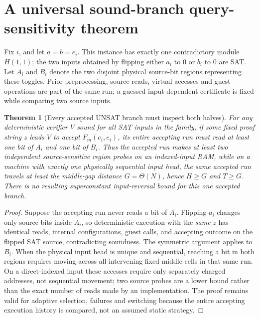 \documentclass[11pt]{article}
\newtheorem{theorem}{Theorem}
\begin{document}
\section{A universal sound-branch query-sensitivity theorem}
Fix $i$, and let $a=b=e_i$. This instance has exactly one contradictory module $H(1,1)$; the two inputs obtained by flipping either $a_i$ to $0$ or $b_i$ to $0$ are SAT. Let $A_i$ and $B_i$ denote the two disjoint physical source-bit regions representing these toggles. Prior preprocessing, source reads, virtual accesses and guest operations are part of the same run; a guessed input-dependent certificate is fixed while comparing two source inputs.
\begin{theorem}[Every accepted UNSAT branch must inspect both halves]\label{th:two}
For \emph{any} deterministic verifier $V$ sound for all SAT inputs in the family, if some fixed proof string $z$ leads $V$ to accept $F_m(e_i,e_i)$, its entire accepting run must read at least one bit of $A_i$ and one bit of $B_i$. Thus the accepted run makes at least two independent source-sensitive region probes on an indexed-input RAM, while on a machine with exactly one physically sequential input head, the same accepted run travels at least the middle-gap distance $G=\Theta(N)$, hence $H\ge G$ and $T\ge G$. There is no resulting superconstant input-reversal bound for this \emph{one accepted branch}.
\end{theorem}
\begin{proof}
Suppose the accepting run never reads a bit of $A_i$. Flipping $a_i$ changes only source bits inside $A_i$, so deterministic execution with the \emph{same} $z$ has identical reads, internal configurations, guest calls, and accepting outcome on the flipped SAT source, contradicting soundness. The symmetric argument applies to $B_i$. When the physical input head is unique and sequential, reaching a bit in both regions requires moving across all intervening fixed middle cells in that same run. On a direct-indexed input these accesses require only separately charged addresses, not sequential movement; two source probes are a lower bound rather than the exact number of reads made by an implementation. The proof remains valid for adaptive selection, failures and switching because the entire accepting execution history is compared, not an assumed static strategy.
\end{proof}
\end{document}

